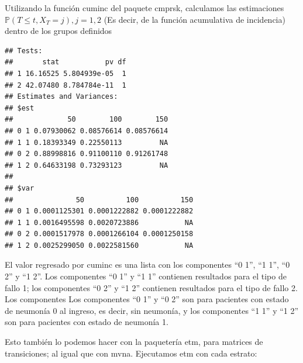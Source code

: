 \documentclass[
]{article}
\newenvironment{Shaded}{\begin{snugshade}}{\end{snugshade}}
\newcommand{\AttributeTok}[1]{\textcolor[rgb]{0.77,0.63,0.00}{#1}}
\newcommand{\DecValTok}[1]{\textcolor[rgb]{0.00,0.00,0.81}{#1}}
\newcommand{\FunctionTok}[1]{\textcolor[rgb]{0.00,0.00,0.00}{#1}}
\newcommand{\NormalTok}[1]{#1}
\newcommand{\OtherTok}[1]{\textcolor[rgb]{0.56,0.35,0.01}{#1}}
\newcommand{\SpecialCharTok}[1]{\textcolor[rgb]{0.00,0.00,0.00}{#1}}
\newcommand{\StringTok}[1]{\textcolor[rgb]{0.31,0.60,0.02}{#1}}
\begin{document}
Utilizando la función cuminc del paquete cmprsk, calculamos las
estimaciones \(\mathbb{P}( T \leq t, X_{T} = j), j = 1, 2\) (Es decir,
de la función acumulativa de incidencia) dentro de los grupos definidos

\begin{Shaded}
\end{Shaded}

\begin{verbatim}
## Tests:
##       stat           pv df
## 1 16.16525 5.804939e-05  1
## 2 42.07480 8.784784e-11  1
## Estimates and Variances:
## $est
##             50        100        150
## 0 1 0.07930062 0.08576614 0.08576614
## 1 1 0.18393349 0.22550113         NA
## 0 2 0.88998816 0.91100110 0.91261748
## 1 2 0.64633198 0.73293123         NA
## 
## $var
##               50          100          150
## 0 1 0.0001125301 0.0001222882 0.0001222882
## 1 1 0.0016495598 0.0020723886           NA
## 0 2 0.0001517978 0.0001266104 0.0001250158
## 1 2 0.0025299050 0.0022581560           NA
\end{verbatim}

El valor regresado por cuminc es una lista con los componentes ``0 1'',
``1 1'', ``0 2'' y ``1 2''. Los componentes ``0 1'' y ``1 1'' contienen
resultados para el tipo de fallo 1; los componentes ``0 2'' y ``1 2''
contienen resultados para el tipo de fallo 2. Los componentes Los
componentes ``0 1'' y ``0 2'' son para pacientes con estado de neumonía
0 al ingreso, es decir, sin neumonía, y los componentes ``1 1'' y ``1
2'' son para pacientes con estado de neumonía 1.

Esto también lo podemos hacer con la paquetería etm, para matrices de
transiciones; al igual que con mvna. Ejecutamos etm con cada estrato:

\begin{Shaded}
\end{Shaded}
\end{document}
